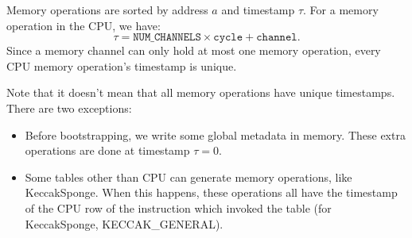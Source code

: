 Memory operations are sorted by address $a$ and timestamp $\tau$. For a memory operation in the CPU, we have:
$$\tau = \texttt{NUM\_CHANNELS} \times \texttt{cycle} + \texttt{channel}.$$
Since a memory channel can only hold at most one memory operation, every CPU memory operation's timestamp is unique.

Note that it doesn't mean that all memory operations have unique timestamps. There are two exceptions:

\begin{itemize}
  \item Before bootstrapping, we write some global metadata in memory. These extra operations are done at timestamp $\tau = 0$.
  \item Some tables other than CPU can generate memory operations, like KeccakSponge. When this happens, these operations all have the timestamp of the CPU row of the instruction which invoked the table (for KeccakSponge, KECCAK\_GENERAL).
\end{itemize}
